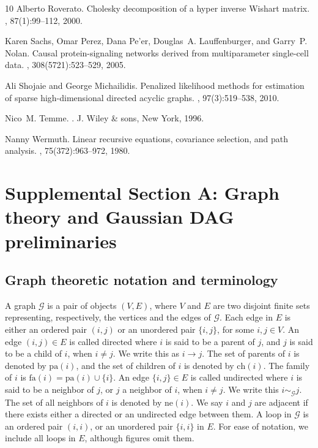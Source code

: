\documentclass[12pt]{article}
\newcommand{\G}{\mathcal{G}}
\theoremstyle{plain}
\theoremstyle{definition}
\theoremstyle{remark}
\begin{document}
\begin{thebibliography}{10}
Alberto Roverato.
\newblock Cholesky decomposition of a hyper inverse {W}ishart matrix.
, 87(1):99--112, 2000.

Karen Sachs, Omar Perez, Dana Pe'er, Douglas~A. Lauffenburger, and Garry~P.
  Nolan.
\newblock Causal protein-signaling networks derived from multiparameter
  single-cell data.
, 308(5721):523--529, 2005.

Ali Shojaie and George Michailidis.
\newblock Penalized likelihood methods for estimation of sparse
  high-dimensional directed acyclic graphs.
, 97(3):519--538, 2010.

Nico~M. Temme.
.
\newblock J. Wiley \& sons, New York, 1996.

Nanny Wermuth.
\newblock Linear recursive equations, covariance selection, and path analysis.
, 75(372):963--972, 1980.

\end{thebibliography}




\newpage

\section*{Supplemental Section A: Graph theory and Gaussian DAG preliminaries}
\medskip
\subsection*{ Graph theoretic notation and terminology}\label{sec:appendixa}
A graph $\G$ is a pair of objects $(V, E)$, where $V$ and $E$ are two disjoint finite sets representing, respectively, the vertices and the edges of $\G$. Each edge in $E$ is either an ordered pair $(i,j)$ or an unordered pair $\{ i,j\}$, for some $i,j\in V$. An edge $(i,j)\in E$ is called directed where $i$ is said to be a parent of $j$, and $j$ is said to be a child of $i$, when $i\neq j$. We write this as $i\rightarrow j$. The set of parents of $i$ is denoted by $\mathrm{pa}(i)$, and the set of children of $i$ is denoted by $\mathrm{ch}(i)$. The family of $i$ is $\mathrm{fa}(i)=\mathrm{pa}(i)\cup \{i\}$. An edge $\{i,j\}\in E$ is called undirected where $i$ is said to be a neighbor of $j$, or $j$ a neighbor of $i$, when $i\neq j$. We write this $i\sim_{\G}j$. The set of all neighbors of $i$ is denoted by $\mathrm{ne}(i)$. We say $i$ and $j$ are adjacent if there exists  either a directed or an undirected edge between them. A loop in $\G$ is an ordered pair 
$(i,i)$, or an unordered pair $\{i,i\}$ in $E$. For ease of notation, we
include all loops in \(E\), although figures omit them.
\end{document}
